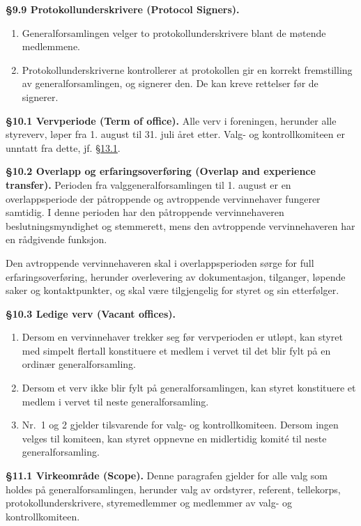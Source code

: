 \documentclass{../../../Common/Latex/Templates/rapport}
\begin{document}
\textbf{\S 9.9 Protokollunderskrivere (Protocol Signers).}\label{bylaw:9.9}
\begin{enumerate}
  \item Generalforsamlingen velger to protokollunderskrivere blant de møtende medlemmene.
  \item Protokollunderskriverne kontrollerer at protokollen gir en korrekt fremstilling av generalforsamlingen, og signerer den. De kan kreve rettelser før de signerer.
\end{enumerate}

\label{bylaw:10}
\textbf{\S 10.1 Vervperiode (Term of office).}\label{bylaw:10.1} Alle verv i foreningen, herunder alle styreverv, løper fra 1. august til 31. juli året etter. Valg- og kontrollkomiteen er unntatt fra dette, jf. \hyperref[bylaw:13.1]{\S 13.1}.

\textbf{\S 10.2 Overlapp og erfaringsoverføring (Overlap and experience transfer).}\label{bylaw:10.2} Perioden fra valggeneralforsamlingen til 1. august er en overlappsperiode der påtroppende og avtroppende vervinnehaver fungerer samtidig. I denne perioden har den påtroppende vervinnehaveren beslutningsmyndighet og stemmerett, mens den avtroppende vervinnehaveren har en rådgivende funksjon.

Den avtroppende vervinnehaveren skal i overlappsperioden sørge for full erfaringsoverføring, herunder overlevering av dokumentasjon, tilganger, løpende saker og kontaktpunkter, og skal være tilgjengelig for styret og sin etterfølger.

\textbf{\S 10.3 Ledige verv (Vacant offices).}\label{bylaw:10.3}
\begin{enumerate}
  \item Dersom en vervinnehaver trekker seg før vervperioden er utløpt, kan styret med simpelt flertall konstituere et medlem i vervet til det blir fylt på en ordinær generalforsamling.
  \item Dersom et verv ikke blir fylt på generalforsamlingen, kan styret konstituere et medlem i vervet til neste generalforsamling.
  \item Nr.\ 1 og 2 gjelder tilsvarende for valg- og kontrollkomiteen. Dersom ingen velges til komiteen, kan styret oppnevne en midlertidig komité til neste generalforsamling.
\end{enumerate}

\label{bylaw:11}
\textbf{\S 11.1 Virkeområde (Scope).}\label{bylaw:11.1} Denne paragrafen gjelder for alle valg som holdes på generalforsamlingen, herunder valg av ordstyrer, referent, tellekorps, protokollunderskrivere, styremedlemmer og medlemmer av valg- og kontrollkomiteen.
\end{document}
